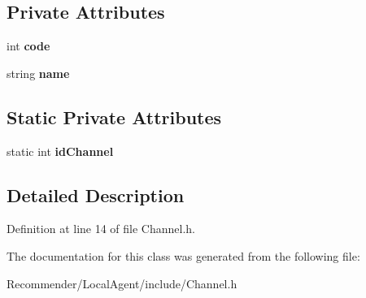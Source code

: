 \subsection*{Private Attributes}
\begin{CompactItemize}
\item 
int {\bf code}\label{classbr_1_1ufscar_1_1lince_1_1ginga_1_1recommender_1_1Channel_45a5b7c00a796a23f01673cef1dbe0a9}

\item 
string {\bf name}\label{classbr_1_1ufscar_1_1lince_1_1ginga_1_1recommender_1_1Channel_8ccf841cb59e451791bcb2e1ac4f1edc}

\end{CompactItemize}
\subsection*{Static Private Attributes}
\begin{CompactItemize}
\item 
static int {\bf idChannel}\label{classbr_1_1ufscar_1_1lince_1_1ginga_1_1recommender_1_1Channel_359829ec4300d6d2f182fd9154cdc681}

\end{CompactItemize}


\subsection{Detailed Description}




Definition at line 14 of file Channel.h.

The documentation for this class was generated from the following file:\begin{CompactItemize}
\item 
Recommender/LocalAgent/include/Channel.h\end{CompactItemize}
